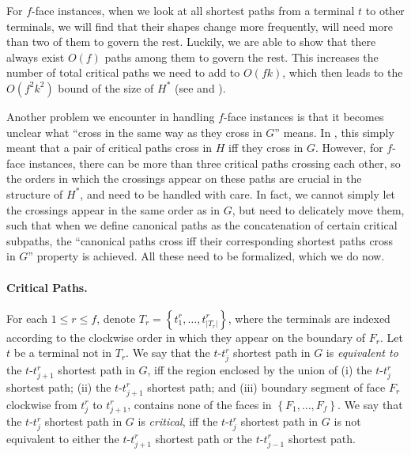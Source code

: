 \documentclass[11pt]{article}
\newcommand{\set}[1]{\left\{ #1 \right\}}
\begin{document}
For $f$-face instances, when we look at all shortest paths from a terminal $t$ to other terminals, we will find that their shapes change more frequently, will need more than two of them to govern the rest. Luckily, we are able to show that there always exist $O(f)$ paths among them to govern the rest. This increases the number of total critical paths we need to add to $O(fk)$, which then leads to the $O(f^2k^2)$ bound of the size of $H^*$ (see  and ). 

Another problem we encounter in handling $f$-face instances is that it becomes unclear what ``cross in the same way as they cross in $G$'' means. In , this simply meant that a pair of critical paths cross in $H$ iff they cross in $G$. However, for $f$-face instances, there can be more than three critical paths crossing each other, so the orders in which the crossings appear on these paths are crucial in the structure of $H^*$, and need to be handled with care. In fact, we cannot simply let the crossings appear in the same order as in $G$, but need to delicately move them, such that when we define canonical paths as the concatenation of certain critical subpaths, the ``canonical paths cross iff their corresponding shortest paths cross in $G$'' property is achieved.
All these need to be formalized, which we do now.

\paragraph{Critical Paths.}
For each $1\le r\le f$, denote $T_r=\set{t^r_1,\ldots,t^r_{|T_r|}}$, where the terminals are indexed according to the clockwise order in which they appear on the boundary of $F_r$. 
Let $t$ be a terminal not in $T_r$. 
We say that the $t$-$t^r_j$ shortest path in $G$ is \emph{equivalent to} the $t$-$t^r_{j+1}$ shortest path in $G$, iff the region enclosed by the union of (i) the $t$-$t^r_j$ shortest path; (ii) the $t$-$t^r_{j+1}$ shortest path; and (iii) boundary segment of face $F_r$ clockwise from $t^r_j$ to $t^r_{j+1}$, contains none of the faces in $\set{F_1,\ldots,F_f}$.
%
We say that the $t$-$t^r_j$ shortest path in $G$ is \emph{critical}, iff the $t$-$t^r_j$ shortest path in $G$ is not equivalent to
either the $t$-$t^r_{j+1}$ shortest path or the $t$-$t^r_{j-1}$ shortest path.
\end{document}
